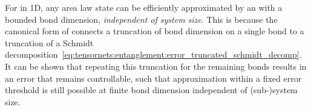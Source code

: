 For  in 1D, any area law state can be efficiently approximated by an  with a bounded bond dimension, \emph{independent of system size}.
%
This is because the canonical form of  connects a truncation of  bond dimension on a single bond to a truncation of a Schmidt decomposition~\eqref{eq:tensornets:entanglement:error_truncated_schmidt_decomp}.
%
It can be shown that repeating this truncation for the remaining bonds results in an error that remains controllable, such that approximation within a fixed error threshold is still possible at finite bond dimension independent of (sub-)system size.